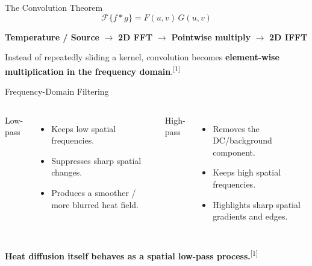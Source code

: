 \documentclass[aspectratio=169,11pt]{beamer}
\begin{document}
\begin{frame}{The Convolution Theorem}
\centering
\vspace{5mm}
\Large
\[
\boxed{\mathcal{F}\{f*g\}=F(u,v)\,G(u,v)}
\]

\vspace{10mm}
\large
\textbf{Temperature / Source}
\quad $\rightarrow$ \quad
\textbf{2D FFT}
\quad $\rightarrow$ \quad
\textbf{Pointwise multiply}
\quad $\rightarrow$ \quad
\textbf{2D IFFT}

\vspace{10mm}
\large
Instead of repeatedly sliding a kernel, convolution becomes \textbf{element-wise multiplication in the frequency domain}.\textsuperscript{[1]}
\end{frame}

\begin{frame}{Frequency-Domain Filtering}
\begin{columns}[T,onlytextwidth]
\centering
\Large Low-pass
\vspace{2mm}
\begin{itemize}\small
  \item Keeps low spatial frequencies.
  \item Suppresses sharp spatial changes.
  \item Produces a smoother / more blurred heat field.
\end{itemize}

\centering
\Large High-pass
\vspace{2mm}
\begin{itemize}\small
  \item Removes the DC/background component.
  \item Keeps high spatial frequencies.
  \item Highlights sharp spatial gradients and edges.
\end{itemize}
\end{columns}

\vfill
\begin{center}
\large
\textbf{Heat diffusion itself behaves as a spatial low-pass process.}\textsuperscript{[1]}
\end{center}
\end{frame}
\end{document}
